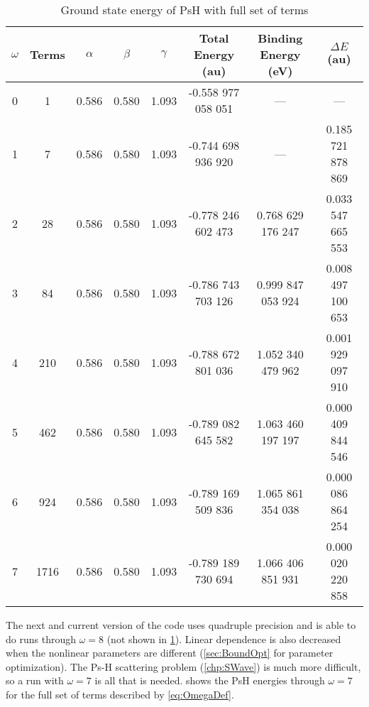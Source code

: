 \documentclass[Dissertation.tex]{subfiles}
\begin{document}
\setlength{\abovecaptionskip}{6pt}   %
\setlength{\belowcaptionskip}{6pt}   %
\begin{table}[H]
\small
\centering
\begin{tabular}{c c c c c c c c}
\toprule
$\omega$ & Terms & $\alpha$ & $\beta$ & $\gamma$ & Total Energy (au) & Binding Energy (eV) & $\Delta E$ (au) \\ [0.5ex]
\midrule
0 & 1    & 0.586 & 0.580 & 1.093 & -0.558 977 058 051 & --- & --- \\
1 & 7    & 0.586 & 0.580 & 1.093 & -0.744 698 936 920 & ---               & 0.185 721 878 869 \\
2 & 28   & 0.586 & 0.580 & 1.093 & -0.778 246 602 473 & 0.768 629 176 247 & 0.033 547 665 553 \\
3 & 84   & 0.586 & 0.580 & 1.093 & -0.786 743 703 126 & 0.999 847 053 924 & 0.008 497 100 653 \\
4 & 210  & 0.586 & 0.580 & 1.093 & -0.788 672 801 036 & 1.052 340 479 962 & 0.001 929 097 910 \\
5 & 462  & 0.586 & 0.580 & 1.093 & -0.789 082 645 582 & 1.063 460 197 197 & 0.000 409 844 546 \\
6 & 924  & 0.586 & 0.580 & 1.093 & -0.789 169 509 836 & 1.065 861 354 038 & 0.000 086 864 254 \\
7 & 1716 & 0.586 & 0.580 & 1.093 & -0.789 189 730 694 & 1.066 406 851 931 & 0.000 020 220 858 \\
\bottomrule
\end{tabular}
\caption{Ground state energy of PsH with full set of terms}
\label{tab:BoundEnergy1}
\end{table}

The next and current version of the code uses quadruple precision and is able to do runs through $\omega = 8$ (not shown in \cref{tab:BoundEnergy1}). Linear dependence is also decreased when the nonlinear parameters are different (\cref{sec:BoundOpt} for parameter optimization). The Ps-H scattering problem (\cref{chp:SWave}) is much more difficult, so a run with $\omega = 7$ is all that is needed.  shows the PsH energies through $\omega = 7$ for the full set of terms described by \cref{eq:OmegaDef}.
\end{document}
